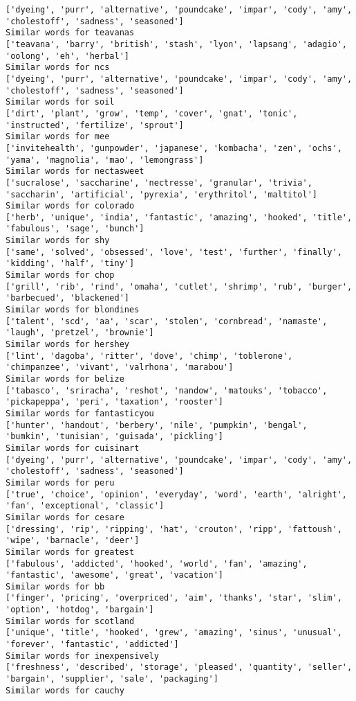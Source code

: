 \documentclass[11pt]{article}
\begin{document}
\begin{Verbatim}[commandchars=\\\{\}]
['dyeing', 'purr', 'alternative', 'poundcake', 'impar', 'cody', 'amy', 'cholestoff', 'sadness', 'seasoned']
Similar words for teavanas
['teavana', 'barry', 'british', 'stash', 'lyon', 'lapsang', 'adagio', 'oolong', 'eh', 'herbal']
Similar words for ncs
['dyeing', 'purr', 'alternative', 'poundcake', 'impar', 'cody', 'amy', 'cholestoff', 'sadness', 'seasoned']
Similar words for soil
['dirt', 'plant', 'grow', 'temp', 'cover', 'gnat', 'tonic', 'instructed', 'fertilize', 'sprout']
Similar words for mee
['invitehealth', 'gunpowder', 'japanese', 'kombacha', 'zen', 'ochs', 'yama', 'magnolia', 'mao', 'lemongrass']
Similar words for nectasweet
['sucralose', 'saccharine', 'nectresse', 'granular', 'trivia', 'saccharin', 'artificial', 'pyrexia', 'erythritol', 'maltitol']
Similar words for colorado
['herb', 'unique', 'india', 'fantastic', 'amazing', 'hooked', 'title', 'fabulous', 'sage', 'bunch']
Similar words for shy
['same', 'solved', 'obsessed', 'love', 'test', 'further', 'finally', 'kidding', 'half', 'tiny']
Similar words for chop
['grill', 'rib', 'rind', 'omaha', 'cutlet', 'shrimp', 'rub', 'burger', 'barbecued', 'blackened']
Similar words for blondines
['talent', 'scd', 'aa', 'scar', 'stolen', 'cornbread', 'namaste', 'laugh', 'pretzel', 'brownie']
Similar words for hershey
['lint', 'dagoba', 'ritter', 'dove', 'chimp', 'toblerone', 'chimpanzee', 'vivant', 'valrhona', 'marabou']
Similar words for belize
['tabasco', 'sriracha', 'reshot', 'nandow', 'matouks', 'tobacco', 'pickapeppa', 'peri', 'taxation', 'rooster']
Similar words for fantasticyou
['hunter', 'handout', 'berbery', 'nile', 'pumpkin', 'bengal', 'bumkin', 'tunisian', 'guisada', 'pickling']
Similar words for cuisinart
['dyeing', 'purr', 'alternative', 'poundcake', 'impar', 'cody', 'amy', 'cholestoff', 'sadness', 'seasoned']
Similar words for peru
['true', 'choice', 'opinion', 'everyday', 'word', 'earth', 'alright', 'fan', 'exceptional', 'classic']
Similar words for cesare
['dressing', 'rip', 'ripping', 'hat', 'crouton', 'ripp', 'fattoush', 'wipe', 'barnacle', 'deer']
Similar words for greatest
['fabulous', 'addicted', 'hooked', 'world', 'fan', 'amazing', 'fantastic', 'awesome', 'great', 'vacation']
Similar words for bb
['finger', 'pricing', 'overpriced', 'aim', 'thanks', 'star', 'slim', 'option', 'hotdog', 'bargain']
Similar words for scotland
['unique', 'title', 'hooked', 'grew', 'amazing', 'sinus', 'unusual', 'forever', 'fantastic', 'addicted']
Similar words for inexpensively
['freshness', 'described', 'storage', 'pleased', 'quantity', 'seller', 'bargain', 'supplier', 'sale', 'packaging']
Similar words for cauchy

\end{Verbatim}
\end{document}
